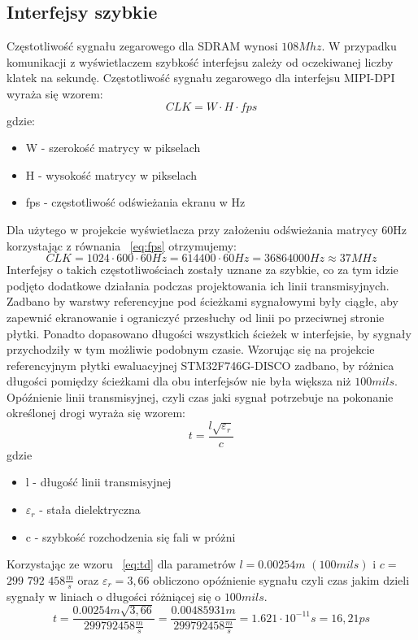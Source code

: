 \documentclass[eng,printmode]{mgr}
\begin{document}
\subsection*{Interfejsy szybkie}
Częstotliwość sygnału zegarowego dla SDRAM wynosi $108Mhz$. W przypadku komunikacji z wyświetlaczem szybkość interfejsu zależy od oczekiwanej liczby klatek na sekundę. Częstotliwość sygnału zegarowego dla interfejsu MIPI-DPI wyraża się wzorem:
\begin{equation}
CLK = W \cdot H \cdot fps \label{eq:fps}
\end{equation}
gdzie:
\begin{itemize}
  \item W - szerokość matrycy w pikselach
  \item H - wysokość matrycy w pikselach
  \item fps - częstotliwość odświeżania ekranu w Hz
\end{itemize}

Dla użytego w projekcie wyświetlacza przy założeniu odświeżania matrycy 60Hz korzystając z równania ~\ref{eq:fps} otrzymujemy:
$$
CLK = 1024 \cdot 600 \cdot 60Hz = 614400 \cdot 60Hz = 36864000 Hz \approx 37MHz
$$
Interfejsy o takich częstotliwościach zostały uznane za szybkie, co za tym idzie podjęto dodatkowe działania podczas projektowania ich linii transmisyjnych. Zadbano by warstwy referencyjne pod ścieżkami sygnałowymi były ciągłe, aby zapewnić ekranowanie i ograniczyć przesłuchy od linii po przeciwnej stronie płytki. Ponadto dopasowano długości wszystkich ścieżek w interfejsie, by sygnały przychodziły w tym możliwie podobnym czasie. Wzorując się na projekcie referencyjnym płytki ewaluacyjnej STM32F746G-DISCO zadbano, by różnica długości pomiędzy ścieżkami dla obu interfejsów nie była większa niż $100 mils$. Opóźnienie linii transmisyjnej, czyli czas jaki sygnał potrzebuje na pokonanie określonej drogi wyraża się wzorem:
\begin{equation}
t = \frac{l \sqrt{\varepsilon_r}}{c} \label{eq:td}
\end{equation}
gdzie
\begin{itemize}
  \item l - długość linii transmisyjnej
  \item \textbf{$\varepsilon_r$} - stała dielektryczna 
  \item c - szybkość rozchodzenia się fali w próżni
\end{itemize}
Korzystając ze wzoru ~\ref{eq:td} dla parametrów $l = 0.00254m$ $(100 mils)$ i $c = $ $299$ $792$ $458\frac{m}{s}$ oraz $\varepsilon_r =3,66$ obliczono opóźnienie sygnału czyli czas jakim dzieli sygnały w liniach o długości różniącej się o $100mils$.
$$
t = \frac{0.00254m \sqrt{3,66}}{299 792 458\frac{m}{s}} = \frac{0.00485931m}{299 792 458\frac{m}{s}} = 1.621\cdot10^{-11}s = 16,21 ps
$$
\end{document}

